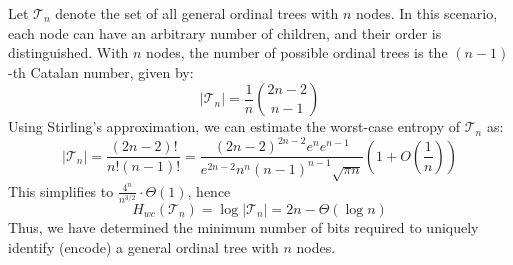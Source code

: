 \begin{example}
    Let $\mathcal{T}_n$ denote the set of all general ordinal trees \cite{benoit2005representing} with $n$ nodes. In this scenario, each node can have an arbitrary number of children, and their order is distinguished. With $n$ nodes, the number of possible ordinal trees is the $(n-1)$-th Catalan number, given by:
    \begin{equation}
        |\mathcal{T}_n| = \frac{1}{n} \binom{2n - 2}{n - 1}
    \end{equation}
    Using Stirling's approximation, we can estimate the worst-case entropy of $\mathcal{T}_n$ as:
    \begin{equation*}
        |\mathcal{T}_n| = \frac{(2n-2)!}{n!(n-1)!} = \frac{(2n-2)^{2n-2} e^n e^{n-1}}{e^{2n-2} n^n (n-1)^{n-1} \sqrt{\pi n}} \left(1+ O\left(\frac{1}{n}\right)\right)
    \end{equation*}
    This simplifies to $\frac{4^n}{n^{3/2}} \cdot \Theta (1)$, hence
    \begin{equation}
        H_{wc} (\mathcal{T}_n) = \log |\mathcal{T}_n| = 2n - \Theta(\log n)
    \end{equation}
    Thus, we have determined the minimum number of bits required to uniquely identify (encode) a general ordinal tree with $n$ nodes.
\end{example}
